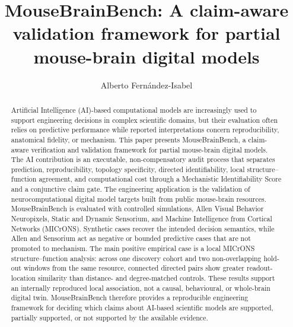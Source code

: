 \documentclass[a4paper,fleqn]{cas-sc}
\begin{document}
\let\WriteBookmarks\relax
\def\floatpagepagefraction{1}
\def\textpagefraction{.001}



\title[mode=title]{MouseBrainBench: A claim-aware validation framework for partial
mouse-brain digital models}


\author[1]{Alberto Fern\'andez-Isabel}
\cormark[1]


\begin{abstract}
Artificial Intelligence (AI)-based computational models are increasingly used to support engineering decisions in complex scientific domains, but their evaluation often relies on predictive performance while reported interpretations concern reproducibility, anatomical fidelity, or mechanism. This paper presents MouseBrainBench, a claim-aware verification and validation framework for partial mouse-brain digital models. The AI contribution is an executable, non-compensatory audit process that separates prediction, reproducibility, topology specificity, directed identifiability, local structure--function agreement, and computational cost through a Mechanistic Identifiability Score and a conjunctive claim gate. The engineering application is the validation of neurocomputational digital model targets built from public mouse-brain resources. MouseBrainBench is evaluated with controlled simulations, Allen Visual Behavior Neuropixels, Static and Dynamic Sensorium, and Machine Intelligence from Cortical Networks (MICrONS). Synthetic cases recover the intended decision semantics, while Allen and Sensorium act as negative or bounded predictive cases that are not promoted to mechanism. The main positive empirical case is a local MICrONS structure--function analysis: across one discovery cohort and two non-overlapping hold-out windows from the same resource, connected directed pairs show greater readout-location similarity than distance- and degree-matched controls. These results support an internally reproduced local association, not a causal, behavioural, or whole-brain digital twin. MouseBrainBench therefore provides a reproducible engineering framework for deciding which claims about AI-based scientific models are supported, partially supported, or not supported by the available evidence.
\end{abstract}
\end{document}
